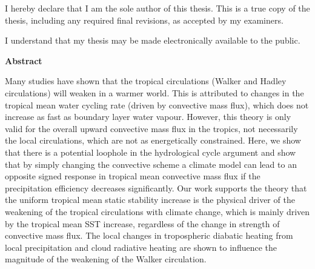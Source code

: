 \cleardoublepage %
 


  \noindent
I hereby declare that I am the sole author of this thesis. This is a true copy of the thesis, including any required final revisions, as accepted by my examiners.

  \bigskip
  
  \noindent
I understand that my thesis may be made electronically available to the public.

\cleardoublepage


\begin{center}\textbf{Abstract}\end{center}

Many studies have shown that the tropical circulations (Walker and Hadley circulations) will weaken in a warmer world. This is attributed to changes in the tropical mean water cycling rate (driven by convective mass flux), which does not increase as fast as boundary layer water vapour. However, this theory is only valid for the overall upward convective mass flux in the tropics, not necessarily the local circulations, which are not as energetically constrained. Here, we show that there is a potential loophole in the hydrological cycle argument and show that by simply changing the convective scheme a climate model can lead to an opposite signed response in tropical mean convective mass flux if the precipitation efficiency decreases significantly. Our work supports the theory that the uniform tropical mean static stability increase is the physical driver of the weakening of the tropical circulations with climate change, which is mainly driven by the tropical mean SST increase, regardless of the change in strength of convective mass flux. The local changes in tropospheric diabatic heating from local precipitation and cloud radiative heating are shown to influence the magnitude of the weakening of the Walker circulation.


